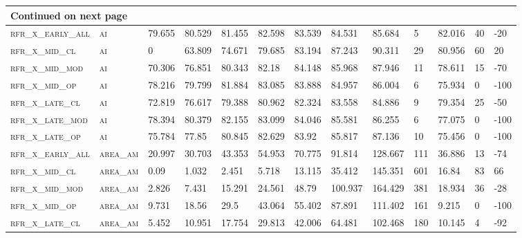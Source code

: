 \begin{landscape}
\begin{center}
\begin{footnotesize}
\begin{longtable}{lllllllllllll}
\hline \multicolumn{13}{|l|}{{Continued on next page}} \\ \hline
\endfoot

\hline \hline
\endlastfoot

\textsc{rfr\_x\_early\_all} & \textsc{ai        }   & 79.655  & 80.529  & 81.455   & 82.598   & 83.539   & 84.531   & 85.684   & 5    & 82.016  & 40  & -20   \\
\textsc{rfr\_x\_mid\_cl   } & \textsc{ai        }   & 0       & 63.809  & 74.671   & 79.685   & 83.194   & 87.243   & 90.311   & 29   & 80.956  & 60  & 20    \\
\textsc{rfr\_x\_mid\_mod  } & \textsc{ai        }   & 70.306  & 76.851  & 80.343   & 82.18    & 84.148   & 85.968   & 87.946   & 11   & 78.611  & 15  & -70   \\
\textsc{rfr\_x\_mid\_op   } & \textsc{ai        }   & 78.216  & 79.799  & 81.884   & 83.085   & 83.888   & 84.957   & 86.004   & 6    & 75.934  & 0   & -100  \\
\textsc{rfr\_x\_late\_cl  } & \textsc{ai        }   & 72.819  & 76.617  & 79.388   & 80.962   & 82.324   & 83.558   & 84.886   & 9    & 79.354  & 25  & -50   \\
\textsc{rfr\_x\_late\_mod } & \textsc{ai        }   & 78.394  & 80.379  & 82.155   & 83.099   & 84.046   & 85.581   & 86.255   & 6    & 77.075  & 0   & -100  \\
\textsc{rfr\_x\_late\_op  } & \textsc{ai        }   & 75.784  & 77.85   & 80.845   & 82.629   & 83.92    & 85.817   & 87.136   & 10   & 75.456  & 0   & -100  \\
\textsc{rfr\_x\_early\_all} & \textsc{area\_am  }   & 20.997  & 30.703  & 43.353   & 54.953   & 70.775   & 91.814   & 128.667  & 111  & 36.886  & 13  & -74   \\
\textsc{rfr\_x\_mid\_cl   } & \textsc{area\_am  }   & 0.09    & 1.032   & 2.451    & 5.718    & 13.115   & 35.412   & 145.351  & 601  & 16.84   & 83  & 66    \\
\textsc{rfr\_x\_mid\_mod  } & \textsc{area\_am  }   & 2.826   & 7.431   & 15.291   & 24.561   & 48.79    & 100.937  & 164.429  & 381  & 18.934  & 36  & -28   \\
\textsc{rfr\_x\_mid\_op   } & \textsc{area\_am  }   & 9.731   & 18.56   & 29.5     & 43.064   & 55.402   & 87.891   & 111.402  & 161  & 9.215   & 0   & -100  \\
\textsc{rfr\_x\_late\_cl  } & \textsc{area\_am  }   & 5.452   & 10.951  & 17.754   & 29.813   & 42.006   & 64.481   & 102.468  & 180  & 10.145  & 4   & -92   \\

\end{longtable}
\end{footnotesize}
\end{center}
\end{landscape}
